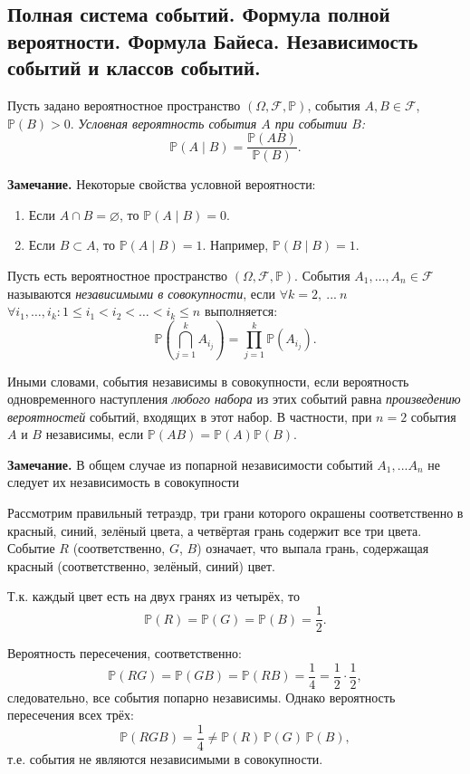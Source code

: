 \subsection{Полная система событий. Формула полной вероятности. Формула Байеса. Независимость событий и классов событий.}

\Def Пусть задано вероятностное пространство $(\Omega, \mathcal{F}, \mathbb{P})$, события $A, B \in \mathcal{F}$, $\mathbb{P}(B) > 0$. \textit{Условная вероятность события $A$ при событии $B$:}
\[
\mathbb{P}(A \mid B) = \frac{\mathbb{P}(AB)}{\mathbb{P}(B)}.
\]

\textbf{Замечание.} Некоторые свойства условной вероятности:
\begin{enumerate}
    \item Если $A \cap B = \varnothing$, то $\mathbb{P}(A \mid B) = 0$.
    \item Если $B \subset A$, то $\mathbb{P}(A \mid B) = 1$. Например, $\mathbb{P}(B \mid B) = 1$.
\end{enumerate}

\Def Пусть есть вероятностное пространство $(\Omega, \mathcal{F}, \mathbb{P})$. События $A_1, \ldots, A_n \in \mathcal{F}$ называются \textit{независимыми в совокупности}, если $\forall k = 2, \ ... \ n$ $\forall i_1,\ldots,i_k : 1 \leq i_1 < i_2 < \ldots < i_k \leq n$ выполняется:
\[
\mathbb{P}\left(\bigcap_{j=1}^k A_{i_j}\right) = \prod_{j=1}^k \mathbb{P}(A_{i_j}).
\]

Иными словами, события независимы в совокупности, если вероятность одновременного наступления \textit{любого набора} из этих событий равна \textit{произведению вероятностей} событий, входящих в этот набор. В частности, при $n=2$ события $A$ и $B$ независимы, если $\mathbb{P}(AB) = \mathbb{P}(A)\mathbb{P}(B)$.

\textbf{Замечание.} В общем случае из попарной независимости событий $A_1, ... A_n$ не следует их независимость в совокупности

\Example Рассмотрим правильный тетраэдр, три грани которого окрашены соответственно в красный, синий, зелёный цвета, а четвёртая грань содержит все три цвета. Событие $R$ (соответственно, $G$, $B$) означает, что выпала грань, содержащая красный (соответственно, зелёный, синий) цвет.

Т.к. каждый цвет есть на двух гранях из четырёх, то
\[
\mathbb{P}(R) = \mathbb{P}(G) = \mathbb{P}(B) = \frac{1}{2}.
\]

Вероятность пересечения, соответственно:
\[
\mathbb{P}(RG) = \mathbb{P}(GB) = \mathbb{P}(RB) = \frac{1}{4} = \frac{1}{2} \cdot \frac{1}{2},
\]
следовательно, все события попарно независимы. Однако вероятность пересечения всех трёх:
\[
\mathbb{P}(RGB) = \frac{1}{4} \neq \mathbb{P}(R) \, \mathbb{P}(G)\, \mathbb{P}(B),
\]
т.е. события не являются независимыми в совокупности.


